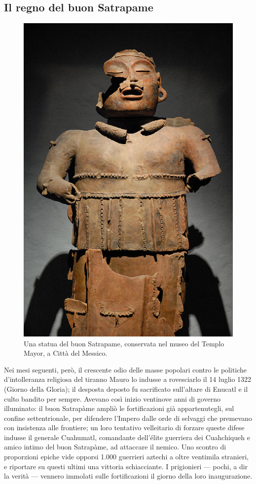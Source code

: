 \documentclass[italian,a4paper]{article}
\begin{document}
 \subsection*{Il regno del buon Satrapame}
\begin{figure}
    \includegraphics[height=.3\textheight]{satrapame.eps}
    \caption{Una statua del buon Satrapame,
    conservata nel museo del Templo Mayor, a Città del Messico.}
\end{figure}
 Nei mesi seguenti, però, il crescente odio
 delle masse popolari contro le politiche d'intolleranza religiosa del
 tiranno Mauro lo indusse a rovesciarlo il 14 luglio 1322 (Giorno della
 Gloria); il desposta deposto fu sacrificato sull'altare di Enucatl e il
 culto bandito per sempre.
 Avevano così inizio ventinove anni di governo illuminato: il buon Satrapàme
 ampliò le fortificazioni già appartenutegli, sul confine settentrionale,
 per difendere l'Impero dalle orde di selvaggi che premevano con insistenza
 alle frontiere; un loro tentativo velleitario di forzare queste difese
 indusse il generale Cuahumatl, comandante dell'élite guerriera dei
 Cuahchiqueh e amico intimo del buon Satrapàme, ad attaccare il nemico. Uno
 scontro di proporzioni epiche vide opporsi 1.000 guerrieri aztechi a oltre
 ventimila stranieri, e riportare su questi ultimi una vittoria
 schiacciante. I prigionieri --- pochi, a dir la verità --- vennero immolati
 sulle fortificazioni il giorno della loro inaugurazione.
\end{document}
